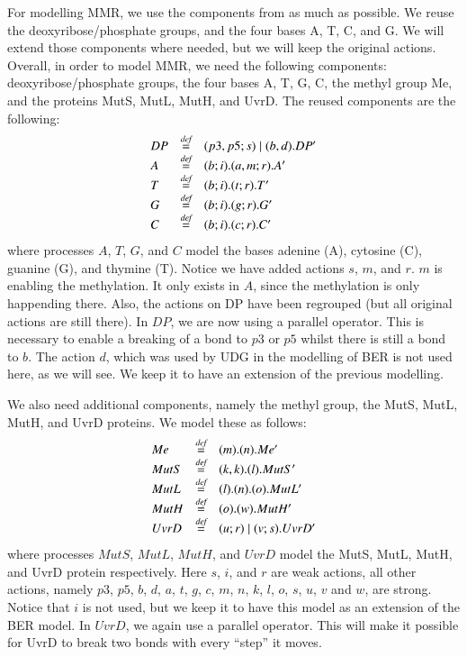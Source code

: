For modelling MMR, we use the components from \cite{10.1007/978-3-319-99498-7_8} as much as possible. We reuse the deoxyribose/phosphate groups, and the four bases A, T, C, and G. We will extend those components where needed, but we will keep the original actions. Overall, in order to model MMR, we need the following components: deoxyribose/phosphate groups, the four bases A, T, G, C, the methyl group Me, and the proteins MutS, MutL, MutH, and UvrD. The reused components are the following:
%
$$\begin{array}{lll}
DP & \stackrel{\emph{def}}{=} & (p3,p5;s) \; \vert \; (b,d).DP'\\
A & \stackrel{\emph{def}}{=} & (b;i).(a,m;r).A'\\
T & \stackrel{\emph{def}}{=} & (b;i).(t;r).T'\\
G & \stackrel{\emph{def}}{=} & (b;i).(g;r).G'\\
C & \stackrel{\emph{def}}{=} & (b;i).(c;r).C'\\
\end{array}$$
%
where processes $A$, $T$, $G$, and $C$ model the bases adenine (A), cytosine (C), guanine (G), and thymine (T). Notice we have added actions $s$, $m$, and $r$. $m$ is enabling the methylation. It only exists in $A$, since the methylation is only happending there. Also, the actions on DP have been regrouped (but all original actions are still there). In $DP$, we are now using a parallel operator. This is necessary to enable a breaking of a bond to $p3$ or $p5$ whilst there is still a bond to $b$. The action $d$, which was used by UDG in the modelling of BER is not used here, as we will see. We keep it to have an extension of the previous modelling.

We also need additional components, namely the methyl group, the MutS, MutL, MutH, and UvrD proteins. We model these as follows:
$$\begin{array}{lll}
Me & \stackrel{\emph{def}}{=} & (m).(n).Me'\\
MutS & \stackrel{\emph{def}}{=} & (k,k).(l).MutS'\\
MutL & \stackrel{\emph{def}}{=} & (l).(n).(o).MutL'\\
MutH & \stackrel{\emph{def}}{=} & (o).(w).MutH'\\
UvrD & \stackrel{\emph{def}}{=} & (u;r) \; \vert \; (v;s).UvrD'\\
\end{array}$$
%
where processes $MutS$, $MutL$, $MutH$, and $UvrD$ model the MutS, MutL, MutH, and UvrD protein respectively.  Here $s$, $i$, and $r$ are weak actions, all other actions, namely $p3$, $p5$, $b$, $d$, $a$, $t$, $g$, $c$, $m$, $n$, $k$, $l$, $o$, $s$, $u$, $v$ and $w$, are strong. Notice that $i$ is not used, but we keep it to have this model as an extension of the BER model. In $UvrD$, we again use a  parallel operator. This will make it possible for UvrD to break two bonds with every ``step'' it moves.


